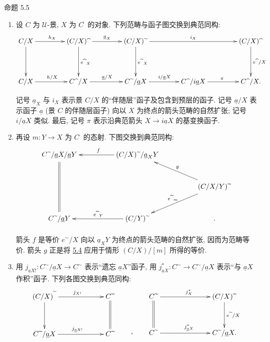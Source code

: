 \begin{enonce*}{命题 5.5}
\begin{enumerate}
\renewcommand{\labelenumi}{\theenumi)}
\item 设 $C$ 为 $𝒰$-景, $X$ 为 $C^{\widehat{\phantom{,}}}$ 的对象.
下列范畴与函子图交换到典范同构:
\[
\xymatrix@C=1.5cm@R=1.5cm{ C/X \ar[r]^{h_X} \ar[d]&
(C/X)\widehat{\phantom{a}} \ar[d]^{e\widehat{\phantom{a}}_X}
\ar[r]^{\underline{a}_X}& (C/X)\widetilde{\phantom{a}} \ar[rr]^{i_X}
\ar[d]^{e\widetilde{\phantom{a}}_X}& &
(C/X)\widehat{\phantom{a}} \ar[d]^{e\widehat{\phantom{a}}/X}\\
C/X \ar[r]^{h/X}& C\widehat{\phantom{a}}/X \ar[r]^{\underline{a}/X}&
C\widetilde{\phantom{a}}/\underline{a}X \ar[r]^{i/\underline{a}X}&
C\widehat{\phantom{a}}/i\underline{a}X \ar[r]^{\pi}&
C\widehat{\phantom{a}}/X. }
\]

记号 $\underline{a}_X$ 与 $i_X$ 表示景 $C/X$ 的“伴随层”函子及包含到预层的函子.
记号 $\underline{a}/X$ 表示函子 $\underline{a}$
(景 $C$ 的伴随层函子) 向以 $X$ 为终点的箭头范畴的自然扩张;
记号 $i/\underline{a}X$ 类似.
最后, 记号 $\pi$ 表示沿典范箭头 $X\rightarrow i\underline{a}X$ 的基变换函子.

\item 再设 $m:Y\rightarrow X$ 为 $C^{\widehat{\phantom{,}}}$ 的态射.
下图交换到典范同构:
\[
\xymatrix@C=1.75cm@H=.5cm{ C\widetilde{\phantom{a}}
/\underline{a}X/\underline{a}Y \ar@{=}[dd]&
(C/X)\widetilde{\phantom{a}}/\underline{a}_X Y \ar[l]_{f}& \\
& & (C/X/Y)\widetilde{\phantom{a}} \ar[lu]_{g} \ar[ld]_{e\widetilde{\phantom{a}}_m}\\
C\widetilde{\phantom{a}}/\underline{a}Y & (C/Y)\widetilde{\phantom{a}}
\ar[l]_{e\widetilde{\phantom{a}}_Y}&. }
\]

箭头\pageoriginale{} $f$ 是等价 $e^{\sim}/X$ 向以 $\underline{a}_XY$
为终点的箭头范畴的自然扩张, 因而为范畴等价.
箭头 $g$ 正是将 \hyperref[III.prop5.4]{5.4} 应用于情形 $(C/X)/[m]$ 所得的等价.

\item 用 $j_{\underline{a}X!}:C^{\sim}/\underline{a}X\rightarrow C^{\sim}$
表示“遗忘 $\underline{a}X$”函子, 用
$j^{\ast}_{\underline{a}X}:C^{\sim}\rightarrow C^{\sim}/\underline{a}X$
表示“与 $\underline{a}X$ 作积”函子. 下列各图交换到典范同构:
\begin{displaymath}
\xymatrix@C=2.25cm@R=1.25cm{ (C/X)^{\widetilde{\phantom{a}}}
\ar[r]^{j_{X!}} \ar[d]   &
  C\widetilde{\phantom{a}} \ar@{=}[d]\\
C\widetilde{\phantom{a}}/\underline{a}X \ar[r]^{j_{\underline{a}X!}} &
C\widetilde{\phantom{a}} } \qquad {\raisebox{-1.75cm}{,}}\qquad
\xymatrix@C=2.5cm@R=1.25cm{
C{\widetilde{\phantom{a}}} \ar[r]^{j_X^{\ast}} \ar@{=}[d]&  (C/X)\widetilde{\phantom{a}}\ar[d]^{e\widetilde{\phantom{a}}/X}\\
C{\widetilde{\phantom{a}}} \ar[r]^{j_{\underline{a}X}^{\ast}} &
C{\widetilde{\phantom{a}}}/\underline{a}X. }
\end{displaymath}
\end{enumerate}
\end{enonce*}


